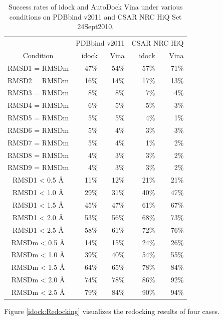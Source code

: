 \begin{table}[t]
\centering
\begin{tabular*}
{\linewidth}
{@{\extracolsep{\fill}}crrrr}
\toprule
& \multicolumn{2}{c}{PDBbind v2011} & \multicolumn{2}{c}{CSAR NRC HiQ}\\
Condition & idock & Vina & idock & Vina\\
\midrule
RMSD1 = RMSDm   & 47\% & 54\% & 57\% & 71\%\\
RMSD2 = RMSDm   & 16\% & 14\% & 17\% & 13\%\\
RMSD3 = RMSDm   &  8\% &  8\% &  7\% &  4\%\\
RMSD4 = RMSDm   &  6\% &  5\% &  5\% &  3\%\\
RMSD5 = RMSDm   &  5\% &  5\% &  4\% &  1\%\\
RMSD6 = RMSDm   &  5\% &  4\% &  3\% &  3\%\\
RMSD7 = RMSDm   &  5\% &  4\% &  1\% &  2\%\\
RMSD8 = RMSDm   &  4\% &  3\% &  3\% &  2\%\\
RMSD9 = RMSDm   &  4\% &  3\% &  3\% &  2\%\\
RMSD1 < 0.5 \AA & 11\% & 12\% & 21\% & 21\%\\
RMSD1 < 1.0 \AA & 29\% & 31\% & 40\% & 47\%\\
RMSD1 < 1.5 \AA & 45\% & 47\% & 61\% & 67\%\\
RMSD1 < 2.0 \AA & 53\% & 56\% & 68\% & 73\%\\
RMSD1 < 2.5 \AA & 58\% & 61\% & 72\% & 76\%\\
RMSDm < 0.5 \AA & 14\% & 15\% & 24\% & 26\%\\
RMSDm < 1.0 \AA & 39\% & 40\% & 54\% & 55\%\\
RMSDm < 1.5 \AA & 64\% & 65\% & 78\% & 84\%\\
RMSDm < 2.0 \AA & 74\% & 78\% & 86\% & 92\%\\
RMSDm < 2.5 \AA & 79\% & 84\% & 90\% & 94\%\\
\bottomrule
\end{tabular*}
\caption{Success rates of idock and AutoDock Vina under various conditions on PDBbind v2011 and CSAR NRC HiQ Set 24Sept2010.}
\label{idock:SuccessRate}
\end{table}

Figure \ref{idock:Redocking} visualizes the redocking results of four cases.

